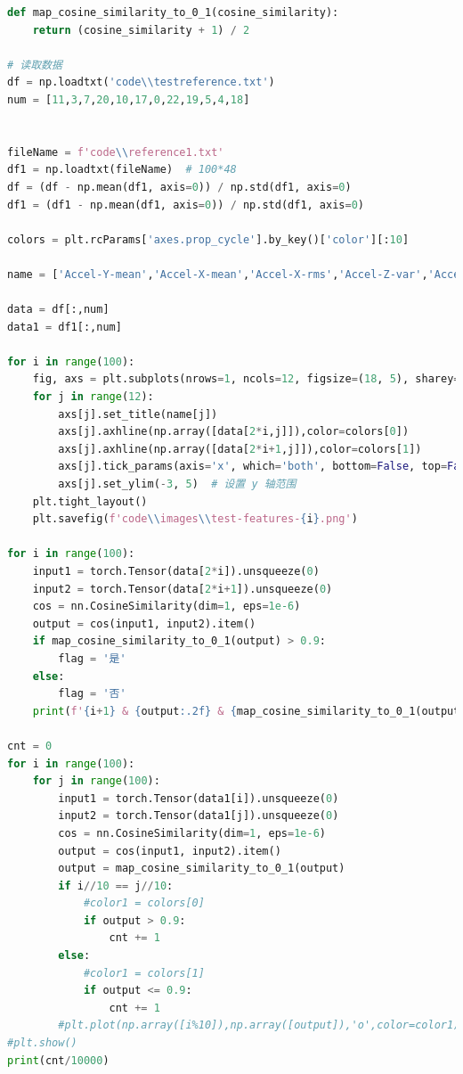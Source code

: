 \documentclass[withoutpreface]{cumcmthesis}
\begin{document}
\begin{appendices}
\begin{lstlisting}[language=python]
def map_cosine_similarity_to_0_1(cosine_similarity):
    return (cosine_similarity + 1) / 2

# 读取数据
df = np.loadtxt('code\\testreference.txt')
num = [11,3,7,20,10,17,0,22,19,5,4,18]


fileName = f'code\\reference1.txt'
df1 = np.loadtxt(fileName)  # 100*48
df = (df - np.mean(df1, axis=0)) / np.std(df1, axis=0)
df1 = (df1 - np.mean(df1, axis=0)) / np.std(df1, axis=0)

colors = plt.rcParams['axes.prop_cycle'].by_key()['color'][:10]

name = ['Accel-Y-mean','Accel-X-mean','Accel-X-rms','Accel-Z-var','Accel-Y-median','Accel-Z-min','Accel-X-max','Accel-Z-peak2peak','Accel-Z-mean','Accel-X-peak','Accel-X-var','Accel-Z-median']

data = df[:,num]
data1 = df1[:,num]

for i in range(100):
    fig, axs = plt.subplots(nrows=1, ncols=12, figsize=(18, 5), sharey=True)
    for j in range(12):
        axs[j].set_title(name[j])
        axs[j].axhline(np.array([data[2*i,j]]),color=colors[0])
        axs[j].axhline(np.array([data[2*i+1,j]]),color=colors[1])
        axs[j].tick_params(axis='x', which='both', bottom=False, top=False, labelbottom=False)  # 隐藏 x 轴刻度
        axs[j].set_ylim(-3, 5)  # 设置 y 轴范围
    plt.tight_layout()
    plt.savefig(f'code\\images\\test-features-{i}.png')

for i in range(100):
    input1 = torch.Tensor(data[2*i]).unsqueeze(0)
    input2 = torch.Tensor(data[2*i+1]).unsqueeze(0)
    cos = nn.CosineSimilarity(dim=1, eps=1e-6)
    output = cos(input1, input2).item()
    if map_cosine_similarity_to_0_1(output) > 0.9:
        flag = '是'
    else:
        flag = '否'
    print(f'{i+1} & {output:.2f} & {map_cosine_similarity_to_0_1(output):.3f} & {flag} \\\\ \\hline ')
    
cnt = 0
for i in range(100):
    for j in range(100):
        input1 = torch.Tensor(data1[i]).unsqueeze(0)
        input2 = torch.Tensor(data1[j]).unsqueeze(0)
        cos = nn.CosineSimilarity(dim=1, eps=1e-6)
        output = cos(input1, input2).item()
        output = map_cosine_similarity_to_0_1(output)
        if i//10 == j//10:
            #color1 = colors[0]
            if output > 0.9:
                cnt += 1
        else:
            #color1 = colors[1]
            if output <= 0.9:
                cnt += 1
        #plt.plot(np.array([i%10]),np.array([output]),'o',color=color1)
#plt.show()
print(cnt/10000)
\end{lstlisting}

\end{appendices}
\end{document}
